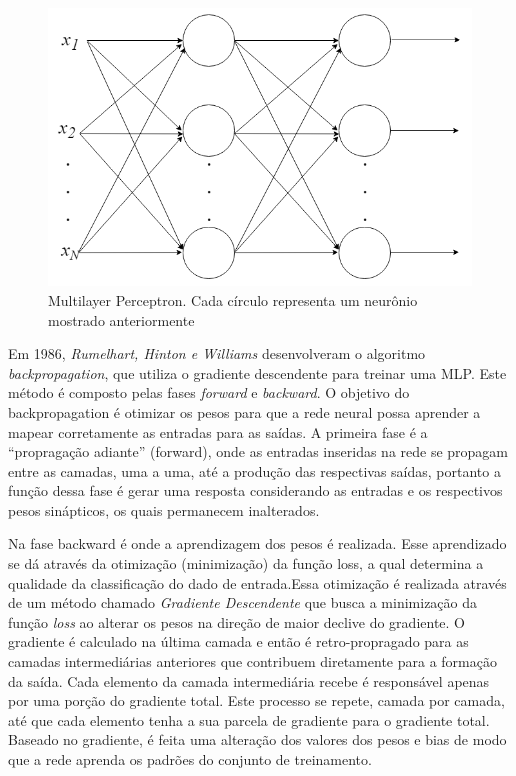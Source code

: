 \begin{figure}[h]
	\centering
	\includegraphics[scale=0.4]{pasta1_figuras/mlp.png}
	\caption{Multilayer Perceptron. Cada círculo representa um neurônio mostrado anteriormente}
	\label{fig-mlp}
\end{figure}

Em 1986, \textit{Rumelhart, Hinton e Williams} \cite{hinton1986} desenvolveram o algoritmo \textit{backpropagation}, que utiliza o gradiente descendente para treinar uma MLP. Este método é composto pelas fases \textit{forward} e \textit{backward}. O objetivo do backpropagation é otimizar os pesos para que a rede neural possa aprender a mapear corretamente as entradas para as saídas. A primeira fase é a ``propragação adiante'' (forward), onde as entradas inseridas na rede se propagam entre as camadas, uma a uma, até a produção das respectivas saídas, portanto a função dessa fase é gerar uma resposta considerando as entradas e os respectivos pesos sinápticos, os quais permanecem inalterados.

Na fase backward é onde a aprendizagem dos pesos é realizada. Esse aprendizado se dá através da otimização (minimização) da função loss, a qual determina a qualidade da classificação do dado de entrada.Essa otimização é realizada através de um método chamado \textit{Gradiente Descendente} que busca a minimização da função \textit{loss} ao alterar os pesos na direção de maior declive do gradiente. O gradiente é calculado na última camada e então é retro-propragado para as camadas intermediárias anteriores que contribuem diretamente para a formação da saída. Cada elemento da camada intermediária recebe é responsável apenas por uma porção do gradiente total. Este processo se repete, camada por camada, até que cada elemento tenha a sua parcela de gradiente para o gradiente total. Baseado no gradiente, é feita uma alteração dos valores dos pesos e bias de modo que a rede aprenda os padrões do conjunto de treinamento.



